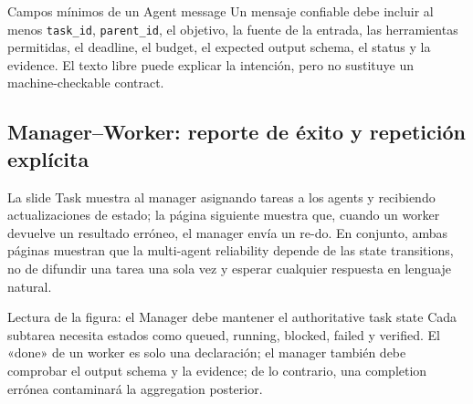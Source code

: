 
\begin{knowledgebox}{Campos mínimos de un Agent message}
Un mensaje confiable debe incluir al menos \texttt{task\_id}, \texttt{parent\_id}, el objetivo, la fuente de la entrada, las herramientas permitidas, el deadline, el budget, el expected output schema, el status y la evidence. El texto libre puede explicar la intención, pero no sustituye un machine-checkable contract.
\end{knowledgebox}


\subsection{Manager--Worker: reporte de éxito y repetición explícita}

La slide Task muestra al manager asignando tareas a los agents y recibiendo actualizaciones de estado; la página siguiente muestra que, cuando un worker devuelve un resultado erróneo, el manager envía un re-do. En conjunto, ambas páginas muestran que la multi-agent reliability depende de las state transitions, no de difundir una tarea una sola vez y esperar cualquier respuesta en lenguaje natural.


\begin{knowledgebox}{Lectura de la figura: el Manager debe mantener el authoritative task state}
Cada subtarea necesita estados como queued, running, blocked, failed y verified. El «done» de un worker es solo una declaración; el manager también debe comprobar el output schema y la evidence; de lo contrario, una completion errónea contaminará la aggregation posterior.
\end{knowledgebox}


